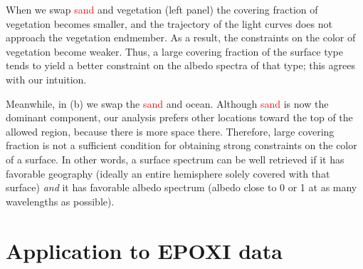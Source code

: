 \documentclass[iop,numberedappendix,apj]{emulateapj}
\def\edit#1{\textcolor{red}{#1}}
\begin{document}
When we swap \edit{sand} and vegetation (left panel) the covering fraction of vegetation becomes smaller, and the trajectory of the light curves does not approach the vegetation endmember. As a result, the constraints on the color of vegetation become weaker. Thus, a large covering fraction of the surface type tends to yield a better constraint on the albedo spectra of that type; this agrees with our intuition.  

Meanwhile, in (b) we swap the \edit{sand} and ocean.  
Although \edit{sand} is now the dominant component, 
our analysis prefers other locations toward the top of the allowed region, because there is more space there. 
Therefore, large covering fraction is not a sufficient condition for obtaining strong constraints on the color of a surface. 
In other words, a surface spectrum can be well retrieved if it has favorable geography (ideally an entire hemisphere solely covered with that surface) {\it and} it has favorable albedo spectrum (albedo close to 0 or 1 at as many wavelengths as possible). 



\section{Application to EPOXI data}
\label{s:EPOXI}
\end{document}

